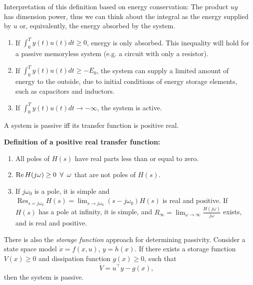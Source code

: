 Interpretation of this definition based on energy conservation: The product $uy$ has dimension power, thus we can think about the integral as the energy supplied by $u$ or, equivalently, the energy absorbed by the system.
\begin{enumerate}
    \item If $\int_0^T y(t)u(t)dt \geq 0$, energy is only absorbed. This inequality will hold for a passive memoryless system (e.g. a circuit with only a resistor).
    \item If $\int_0^T y(t)u(t)dt \geq -E_0$, the system can supply a limited amount of energy to the outside, due to initial conditions of energy storage elements, such as capacitors and inductors.
    \item If $\int_0^T y(t)u(t)dt \to -\infty$, the system is active.
\end{enumerate}
A system is passive iff its transfer function is positive real.

\textbf{Definition of a positive real transfer function:}
\begin{enumerate}
    \item All poles of $H(s)$ have real parts less than or equal to zero.
    \item $\operatorname{Re} H(j\omega) \geq 0 \enskip \forall \enskip \omega$ that are not poles of $H(s)$.
    \item If $j\omega_0$ is a pole, it is simple and $\operatorname{Res}_{s=j\omega_0} H(s) = \lim_{s \to j\omega_0} (s-j\omega_0)H(s)$ is real and positive. If $H(s)$ has a pole at infinity, it is simple, and $R_\infty = \lim_{\omega \to \infty} \frac{H(j\omega)}{j\omega}$ exists, and is real and positive.
\end{enumerate}
There is also the \textit{storage function} approach for determining passivity. Consider a state space model $\dot{x} = f(x,u)$, $y=h(x)$. If there exists a storage function $V(x) \geq 0$ and dissipation function $g(x) \geq 0$, such that
\begin{equation}
    \dot{V} = u^\top y - g(x),
\end{equation}
then the system is passive.